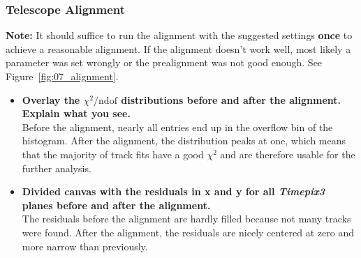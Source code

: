 \documentclass[a4paper,11pt]{article}
\newcommand*{\tpx}{\emph{Timepix3}\xspace}
\begin{document}
\subsubsection{Telescope Alignment}
\textbf{Note:} It should suffice to run the alignment with the suggested settings \textbf{once} to achieve a reasonable alignment.
If the alignment doesn't work well, most likely a parameter was set wrongly or the prealignment was not good enough.
See Figure~\ref{fig:07_alignment}.
\begin{itemize}
\item \textbf{Overlay the $\chi^2/\text{ndof}$ distributions before and after the alignment. Explain what you see.}\\
Before the alignment, nearly all entries end up in the overflow bin of the histogram.
After the alignment, the distribution peaks at one, which means that the majority of track fits have a good $\chi^2$ and are therefore usable for the further analysis.
\item \textbf{Divided canvas with the residuals in x and y for all \tpx planes before and after the alignment.}\\
The residuals before the alignment are hardly filled because not many tracks were found.
After the alignment, the residuals are nicely centered at zero and more narrow than previously.
\end{itemize}
\end{document}
